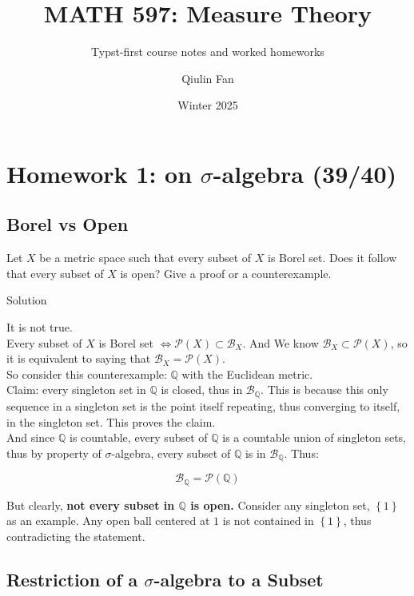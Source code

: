 \documentclass{qlnotes-export}
\title{MATH 597: Measure Theory}
\subtitle{Typst-first course notes and worked homeworks}
\author{Qiulin Fan}
\date{Winter 2025}
\begin{document}
\mainmatter
\chapter{\texorpdfstring{Homework 1: on \(\sigma\)-algebra (39/40)}{Homework 1: on \textbackslash sigma-algebra (39/40)}}\label{homework-1-on-sigma-algebra-3940}

\section{Borel vs Open}\label{borel-vs-open}

Let \(X\) be a metric space such that every subset of \(X\) is Borel set. Does it follow that every subset of \(X\) is open? Give a proof or a counterexample.

\begin{qlsolution}{Solution}

It is not true.\\
Every subset of \(X\) is Borel set \(\Leftrightarrow\mathcal{P}(X) \subset \mathcal{B}_{X}\). And We know \(\mathcal{B}_{X} \subset \mathcal{P}(X)\), so it is equivalent to saying that \(\mathcal{B}_{X} = \mathcal{P}(X)\).\\
So consider this counterexample: \(\mathbb{Q}\) with the Euclidean metric.\\
Claim: every singleton set in \(\mathbb{Q}\) is closed, thus in \(\mathcal{B}_{\mathbb{Q}}\). This is because this only sequence in a singleton set is the point itself repeating, thus converging to itself, in the singleton set. This proves the claim.\\
And since \(\mathbb{Q}\) is countable, every subset of \(\mathbb{Q}\) is a countable union of singleton sets, thus by property of \(\sigma\)-algebra, every subset of \(\mathbb{Q}\) is in \(\mathcal{B}_{\mathbb{Q}}\). Thus:

\[\mathcal{B}_{\mathbb{Q}} = \mathcal{P}({\mathbb{Q}})\]

But clearly, \textbf{not every subset in \(\mathbb{Q}\) is open.} Consider any singleton set, \(\left\{ 1 \right\}\) as an example. Any open ball centered at \(1\) is not contained in \(\left\{ 1 \right\}\), thus contradicting the statement.

\end{qlsolution}

\section{\texorpdfstring{Restriction of a \(\sigma\)-algebra to a Subset}{Restriction of a \textbackslash sigma-algebra to a Subset}}\label{restriction-of-a-sigma-algebra-to-a-subset}
\end{document}
